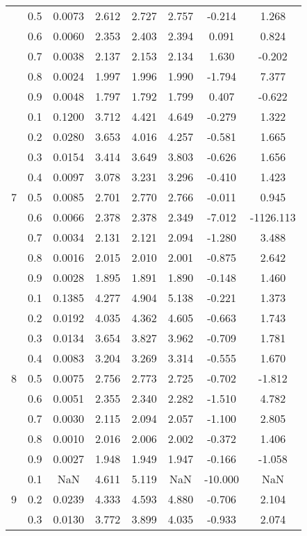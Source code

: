 \documentclass[11pt,a4paper]{report}
\begin{document}
\begin{longtable}{ | c | c || c | c | c | c | c | c | }
 & 0.5 & 0.0073 & 2.612 & 2.727 & 2.757 & -0.214 & 1.268 \\
 & 0.6 & 0.0060 & 2.353 & 2.403 & 2.394 & 0.091 & 0.824 \\
 & 0.7 & 0.0038 & 2.137 & 2.153 & 2.134 & 1.630 & -0.202 \\
 & 0.8 & 0.0024 & 1.997 & 1.996 & 1.990 & -1.794 & 7.377 \\
 & 0.9 & 0.0048 & 1.797 & 1.792 & 1.799 & 0.407 & -0.622 \\
 \hline
\multirow{9}{*}{7} & 0.1 & 0.1200 & 3.712 & 4.421 & 4.649 & -0.279 & 1.322 \\
 & 0.2 & 0.0280 & 3.653 & 4.016 & 4.257 & -0.581 & 1.665 \\
 & 0.3 & 0.0154 & 3.414 & 3.649 & 3.803 & -0.626 & 1.656 \\
 & 0.4 & 0.0097 & 3.078 & 3.231 & 3.296 & -0.410 & 1.423 \\
 & 0.5 & 0.0085 & 2.701 & 2.770 & 2.766 & -0.011 & 0.945 \\
 & 0.6 & 0.0066 & 2.378 & 2.378 & 2.349 & -7.012 & -1126.113 \\
 & 0.7 & 0.0034 & 2.131 & 2.121 & 2.094 & -1.280 & 3.488 \\
 & 0.8 & 0.0016 & 2.015 & 2.010 & 2.001 & -0.875 & 2.642 \\
 & 0.9 & 0.0028 & 1.895 & 1.891 & 1.890 & -0.148 & 1.460 \\
 \hline
\multirow{9}{*}{8} & 0.1 & 0.1385 & 4.277 & 4.904 & 5.138 & -0.221 & 1.373 \\
 & 0.2 & 0.0192 & 4.035 & 4.362 & 4.605 & -0.663 & 1.743 \\
 & 0.3 & 0.0134 & 3.654 & 3.827 & 3.962 & -0.709 & 1.781 \\
 & 0.4 & 0.0083 & 3.204 & 3.269 & 3.314 & -0.555 & 1.670 \\
 & 0.5 & 0.0075 & 2.756 & 2.773 & 2.725 & -0.702 & -1.812 \\
 & 0.6 & 0.0051 & 2.355 & 2.340 & 2.282 & -1.510 & 4.782 \\
 & 0.7 & 0.0030 & 2.115 & 2.094 & 2.057 & -1.100 & 2.805 \\
 & 0.8 & 0.0010 & 2.016 & 2.006 & 2.002 & -0.372 & 1.406 \\
 & 0.9 & 0.0027 & 1.948 & 1.949 & 1.947 & -0.166 & -1.058 \\
 \hline
\multirow{9}{*}{9} & 0.1 & NaN & 4.611 & 5.119 & NaN & -10.000 & NaN \\
 & 0.2 & 0.0239 & 4.333 & 4.593 & 4.880 & -0.706 & 2.104 \\
 & 0.3 & 0.0130 & 3.772 & 3.899 & 4.035 & -0.933 & 2.074 \\

\end{longtable}
\end{document}
